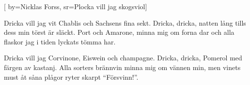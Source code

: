 
[
  by={Nicklas Forss},
  sr={Plocka vill jag skogsviol}]

\beginverse*
Dricka vill jag vit Chablis och Sachsens fina sekt.
Dricka, dricka, natten lång tills dess min törst är släckt.
Port och Amarone, minna mig om forna dar
och alla flaskor jag i tiden lyckats tömma har.
\endverse

\beginverse*
Dricka vill jag Corvinone, Eiswein och champagne.
Dricka, dricka, Pomerol med färgen av kastanj.
Alla sorters brännvin minna mig om vännen min,
men vinets must åt såna plågor ryter skarpt ``Försvinn!''.
\endverse
\endsong